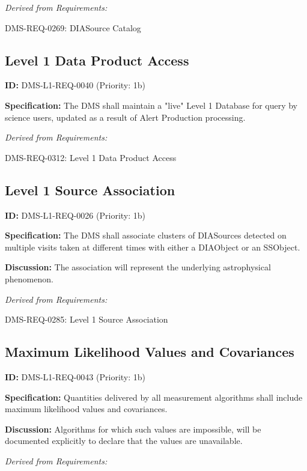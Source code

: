 \documentclass[SE,toc,lsstdraft]{lsstdoc}
\begin{document}
\emph{Derived from Requirements:}

DMS-REQ-0269:
DIASource Catalog \newline

\subsection{Level 1 Data Product Access}

\label{DMS-L1-REQ-0040}
\textbf{ID:} DMS-L1-REQ-0040 (Priority: 1b)

\textbf{Specification:} The DMS shall maintain a "live" Level 1 Database for query by science users, updated as a result of Alert Production processing.

\emph{Derived from Requirements:}

DMS-REQ-0312:
Level 1 Data Product Access \newline

\subsection{Level 1 Source Association}

\label{DMS-L1-REQ-0026}
\textbf{ID:} DMS-L1-REQ-0026 (Priority: 1b)

\textbf{Specification:} The DMS shall associate clusters of DIASources detected on multiple visits taken at different times with either a DIAObject or an SSObject.

\textbf{Discussion: }The association will represent the underlying astrophysical phenomenon.

\emph{Derived from Requirements:}

DMS-REQ-0285:
Level 1 Source Association \newline

\subsection{Maximum Likelihood Values and Covariances}

\label{DMS-L1-REQ-0043}
\textbf{ID:} DMS-L1-REQ-0043 (Priority: 1b)

\textbf{Specification:} Quantities delivered by all measurement algorithms shall include maximum likelihood values and covariances.

\textbf{Discussion:} Algorithms for which such values are impossible, will be documented explicitly to declare that the values are unavailable.

\emph{Derived from Requirements:}
\end{document}
